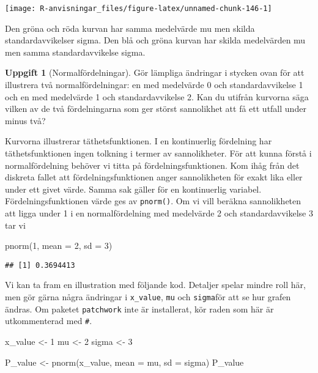 \documentclass[
]{book}
\newenvironment{Shaded}{\begin{snugshade}}{\end{snugshade}}
\newcommand{\AttributeTok}[1]{\textcolor[rgb]{0.77,0.63,0.00}{#1}}
\newcommand{\DecValTok}[1]{\textcolor[rgb]{0.00,0.00,0.81}{#1}}
\newcommand{\FunctionTok}[1]{\textcolor[rgb]{0.00,0.00,0.00}{#1}}
\newcommand{\NormalTok}[1]{#1}
\newcommand{\OtherTok}[1]{\textcolor[rgb]{0.56,0.35,0.01}{#1}}
\theoremstyle{definition}
\theoremstyle{definition}
\theoremstyle{definition}
\newtheorem{exercise}{Uppgift}[chapter]
\theoremstyle{definition}
\theoremstyle{remark}
\begin{document}
\begin{center}\texttt{[image: R-anvisningar\_files/figure-latex/unnamed-chunk-146-1]} \end{center}

Den gröna och röda kurvan har samma medelvärde mu men skilda standardavvikelser sigma. Den blå och gröna kurvan har skilda medelvärden mu men samma standardavvikelse sigma.

\begin{exercise}[Normalfördelningar]
Gör lämpliga ändringar i stycken ovan för att illustrera två normalfördelningar: en med medelvärde 0 och standardavvikelse 1 och en med medelvärde 1 och standardavvikelse 2. Kan du utifrån kurvorna säga vilken av de två fördelningarna som ger störst sannolikhet att få ett utfall under minus två?
\end{exercise}

Kurvorna illustrerar täthetsfunktionen. I en kontinuerlig fördelning har täthetsfunktionen ingen tolkning i termer av sannolikheter. För att kunna förstå i normalfördelning behöver vi titta på fördelningsfunktionen. Kom ihåg från det diskreta fallet att fördelningsfunktionen anger sannolikheten för exakt lika eller under ett givet värde. Samma sak gäller för en kontinuerlig variabel. Fördelningsfunktionen värde ges av \texttt{pnorm()}. Om vi vill beräkna sannolikheten att ligga under 1 i en normalfördelning med medelvärde 2 och standardavvikelse 3 tar vi

\begin{Shaded}
\begin{Highlighting}[]
\FunctionTok{pnorm}\NormalTok{(}\DecValTok{1}\NormalTok{, }\AttributeTok{mean =} \DecValTok{2}\NormalTok{, }\AttributeTok{sd =} \DecValTok{3}\NormalTok{)}
\end{Highlighting}
\end{Shaded}

\begin{verbatim}
## [1] 0.3694413
\end{verbatim}

Vi kan ta fram en illustration med följande kod. Detaljer spelar mindre roll här, men gör gärna några ändringar i \texttt{x\_value}, \texttt{mu} och \texttt{sigma}för att se hur grafen ändras. Om paketet \texttt{patchwork} inte är installerat, kör raden som här är utkommenterad med \texttt{\#}.

\begin{Shaded}
\begin{Highlighting}[]
\NormalTok{x\_value }\OtherTok{\textless{}{-}} \DecValTok{1}
\NormalTok{mu }\OtherTok{\textless{}{-}} \DecValTok{2}
\NormalTok{sigma }\OtherTok{\textless{}{-}} \DecValTok{3}

\NormalTok{P\_value }\OtherTok{\textless{}{-}} \FunctionTok{pnorm}\NormalTok{(x\_value, }\AttributeTok{mean =}\NormalTok{ mu, }\AttributeTok{sd =}\NormalTok{ sigma)}
\NormalTok{P\_value}
\end{Highlighting}
\end{Shaded}
\end{document}
